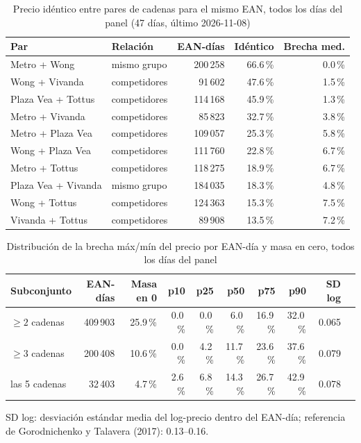 
\begin{table}[htbp]
\caption{Precio id\'entico entre pares de cadenas para el mismo EAN, todos los d\'ias del panel (47 d\'ias, \'ultimo 2026-11-08)}
\label{tab:identidad}
\centering\scriptsize\setlength{\tabcolsep}{3pt}
\begin{tabular}{@{}llrrr@{}}
\toprule
Par & Relaci\'on & EAN-d\'ias & Id\'entico & Brecha med. \\
\midrule
Metro + Wong & mismo grupo & 200\,258 & 66.6\,\% & 0.0\,\% \\
Wong + Vivanda & competidores & 91\,602 & 47.6\,\% & 1.5\,\% \\
Plaza Vea + Tottus & competidores & 114\,168 & 45.9\,\% & 1.3\,\% \\
Metro + Vivanda & competidores & 85\,823 & 32.7\,\% & 3.8\,\% \\
Metro + Plaza Vea & competidores & 109\,057 & 25.3\,\% & 5.8\,\% \\
Wong + Plaza Vea & competidores & 111\,760 & 22.8\,\% & 6.7\,\% \\
Metro + Tottus & competidores & 118\,275 & 18.9\,\% & 6.7\,\% \\
Plaza Vea + Vivanda & mismo grupo & 184\,035 & 18.3\,\% & 4.8\,\% \\
Wong + Tottus & competidores & 124\,363 & 15.3\,\% & 7.5\,\% \\
Vivanda + Tottus & competidores & 89\,908 & 13.5\,\% & 7.2\,\% \\
\bottomrule\end{tabular}\end{table}

\begin{table}[t]
\caption{Distribuci\'on de la brecha m\'ax/m\'in del precio por EAN-d\'ia y masa en cero, todos los d\'ias del panel}
\label{tab:brecha}
\centering\scriptsize\setlength{\tabcolsep}{4pt}
\begin{tabular}{@{}lrrrrrrrrr@{}}
\toprule
Subconjunto & EAN-d\'ias & Masa en 0 & p10 & p25 & p50 & p75 & p90 & SD log \\
\midrule
$\geq 2$ cadenas & 409\,903 & 25.9\,\% & 0.0\,\% & 0.0\,\% & 6.0\,\% & 16.9\,\% & 32.0\,\% & 0.065 \\
$\geq 3$ cadenas & 200\,408 & 10.6\,\% & 0.0\,\% & 4.2\,\% & 11.7\,\% & 23.6\,\% & 37.6\,\% & 0.079 \\
las 5 cadenas & 32\,403 & 4.7\,\% & 2.6\,\% & 6.8\,\% & 14.3\,\% & 26.7\,\% & 42.9\,\% & 0.078 \\
\bottomrule\end{tabular}
\par\smallskip\raggedright\scriptsize SD log: desviaci\'on est\'andar media del log-precio dentro del EAN-d\'ia; referencia de Gorodnichenko y Talavera (2017): 0.13--0.16.
\end{table}

